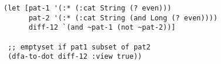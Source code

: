 \begin{lstlisting}[style=reclojureClojure]
(let [pat-1 '(:* (:cat String (? even)))
      pat-2 '(:* (:cat String (and Long (? even))))
      diff-12 `(and ~pat-1 (not ~pat-2))]

 ;; emptyset if pat1 subset of pat2
 (dfa-to-dot diff-12 :view true))
\end{lstlisting}
